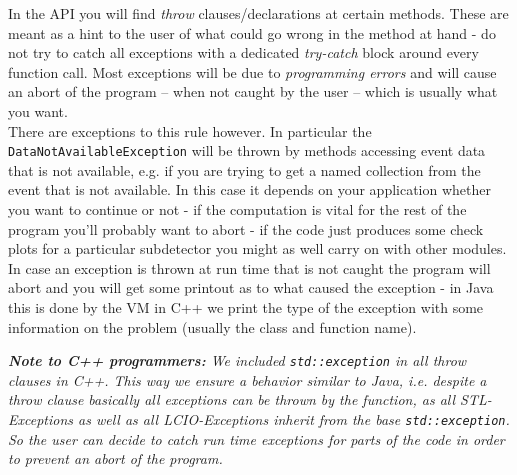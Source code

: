 \documentclass[twoside]{article}
\begin{document}
In the API you will find {\em throw} clauses/declarations at certain methods. These are meant as a hint
to the user of what could go wrong in the method at hand - do not try to catch all exceptions with a 
dedicated {\em try-catch} block around every function call. Most exceptions will be due to 
{\em programming errors} and will cause an abort of the program -- when not caught by the user -- 
which is usually what you want.\\
There are exceptions to this rule however. In particular the \verb$DataNotAvailableException$ will be
thrown by methods accessing event data that is not available, e.g. if you are trying to get a named 
collection from the event that is not available. 
In this case it depends on your application whether you want to continue or not - if the 
computation is vital for the rest of the program you'll probably want to abort - if the code just
produces some check plots for a particular subdetector you might as well carry on with other 
modules.\\
In case an exception is thrown at run time that is not caught the program will abort and you will get 
some printout as to what caused the exception - 
in Java this is done by the VM in C++ we print the type of the exception with some information on the 
problem (usually the class and function name).

\vspace{\baselineskip}
{\it {\bf Note to C++ programmers:} We included \verb$std::exception$ in all {\em throw} clauses in 
C++. This way we ensure a behavior similar to Java, i.e. despite a {\em throw}
clause basically all exceptions can be thrown by the function, as all STL-Exceptions 
as well as all LCIO-Exceptions inherit from the base \verb$std::exception$. So the user can decide to
catch {\em run time} exceptions for parts of the code in order to prevent an abort of the program. 
}




\end{document}
